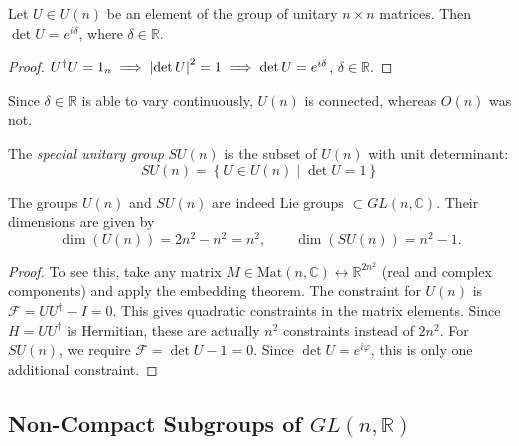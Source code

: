 \begin{claim}
  Let $U \in U(n)$ be an element of the group of unitary $n \times n$ matrices. Then $\det U = e^{i\delta}$, where $\delta \in \mathbb{R}$.
\end{claim}
\begin{proof}
  $U^{\dagger}U = 1_n \implies \abs{\det U}^2 = 1 \implies \det U = e^{i\delta}$, $\delta \in \mathbb{R}$.
\end{proof}
\begin{leftbar}
  \begin{remark}
    Since $\delta \in \mathbb{R}$ is able to vary continuously, $U(n)$ is connected, whereas $O(n)$ was not.
  \end{remark}
\end{leftbar}

\begin{definition}
  The \emph{special unitary group} $SU(n)$ is the subset of $U(n)$ with unit determinant:
  \begin{equation}
    SU(n) = \left\{ U \in U(n) \mid \det U = 1 \right\}
  \end{equation}
\end{definition}

\begin{claim}
  The groups $U(n)$ and $SU(n)$ are indeed Lie groups $\subset GL(n, \mathbb{C})$. Their dimensions are given by
  \begin{equation}
    \dim(U(n)) = 2n^2 - n^2 = n^2, \qquad \dim(SU(n)) = n^2 -1.
  \end{equation}
\end{claim}
\begin{proof}
  To see this, take any matrix $M \in \text{Mat}(n, \mathbb{C}) \leftrightarrow \mathbb{R}^{2n^2}$ (real and complex components) and apply the embedding theorem.
  The constraint for $U(n)$ is  $\mathcal{F} = U U^{\dagger} - I = 0$. This gives quadratic constraints in the matrix elements. Since $H = U U^{\dagger}$ is Hermitian, these are actually $n^2$ constraints instead of $2n^2$.
  For $SU(n)$, we require $\mathcal{F} = \det U - 1 = 0$. Since $\det U = e^{i\varphi}$, this is only one additional constraint.
\end{proof}

\subsection{Non-Compact Subgroups of \texorpdfstring{$GL(n, \mathbb{R})$}{GL(n, R)}}%
\label{sub:non_compact_subgroups_of_gl_n_r}

